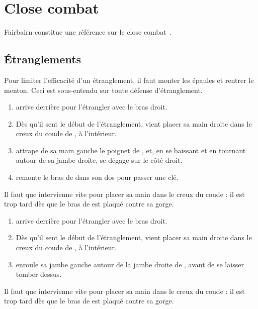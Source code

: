\chapter{Close combat}


Fairbairn constitue une référence sur le close combat~\cite{fairbairn:allin:2008}.




\section{Étranglements}


Pour limiter l'efficacité d'un étranglement, il faut monter les épaules et rentrer le menton.
Ceci est sous-entendu sur toute défense d'étranglement.


\begin{technique}

\begin{enumerate}
	\item \A arrive derrière \D pour l'étrangler avec le bras droit.
	
	\item Dès qu'il sent le début de l'étranglement, \D vient placer sa main droite dans le creux du coude de \A, à l'intérieur.
	
	\item \D attrape de sa main gauche le poignet de \A, et, en se baissant et en tournant autour de sa jambe droite, se dégage sur le côté droit.
	
	\item \D remonte le bras de \A dans son dos pour passer une clé.
\end{enumerate}

Il faut que \D intervienne vite pour placer sa main dans le creux du coude : il est trop tard dès que le bras de \A est plaqué contre sa gorge.

\end{technique}


\begin{technique}

\begin{enumerate}
	\item \A arrive derrière \D pour l'étrangler avec le bras droit.
	
	\item Dès qu'il sent le début de l'étranglement, \D vient placer sa main droite dans le creux du coude de \A, à l'intérieur.
	
	\item {} \D enroule sa jambe gauche autour de la jambe droite de \A, avant de se laisser tomber dessus.
\end{enumerate}

Il faut que \D intervienne vite pour placer sa main dans le creux du coude : il est trop tard dès que le bras de \A est plaqué contre sa gorge.

\end{technique}


